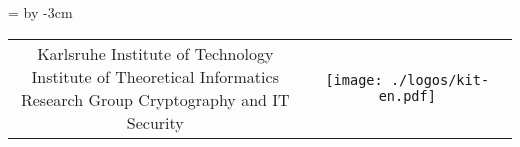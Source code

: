 { %
\footnotesize\sffamily
\newdimen\addresswidth
\addresswidth=\textwidth
\advance\addresswidth by -3cm
\noindent\begin{tabular}{@{}c@{}c@{}}
\parbox{\addresswidth}{Karlsruhe Institute of Technology\\Institute of Theoretical Informatics\\Research Group Cryptography and IT Security} & \parbox{3cm}{\texttt{[image: ./logos/kit-en.pdf]}}
\end{tabular}
} %

\vspace{\baselineskip}

\begin{center}
\makeatletter
{\Large\bfseries\@title\\}
\vspace{\baselineskip}
{
\@author\\
\@subtitle{}\\
\@date
\makeatother
}
\end{center}

\vspace{\baselineskip}
